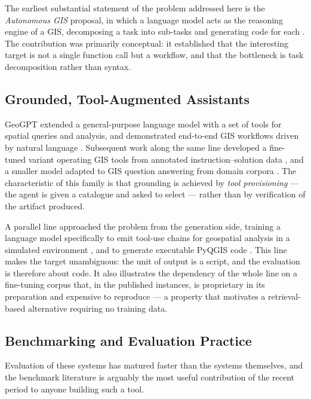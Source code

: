 The earliest substantial statement of the problem addressed here is the
\emph{Autonomous GIS} proposal, in which a language model acts as the reasoning
engine of a GIS, decomposing a task into sub-tasks and generating code for each
\cite{li2023autonomousgis}. The contribution was primarily conceptual: it
established that the interesting target is not a single function call but a
workflow, and that the bottleneck is task decomposition rather than syntax.

\subsection{Grounded, Tool-Augmented Assistants}

GeoGPT extended a general-purpose language model with a set of tools for
spatial queries and analysis, and demonstrated end-to-end GIS workflows driven
by natural language \cite{zhang2023geogpt}. Subsequent work along the same line
developed a fine-tuned variant operating GIS tools from annotated
instruction--solution data \cite{wei2024geotoolgpt}, and a smaller model adapted
to GIS question answering from domain corpora \cite{zhang2024bbgeogpt}. The
characteristic of this family is that grounding is achieved by \emph{tool
provisioning} --- the agent is given a catalogue and asked to select --- rather
than by verification of the artifact produced.

A parallel line approached the problem from the generation side, training a
language model specifically to emit tool-use chains for geospatial analysis in
a simulated environment \cite{zhang2024geollmtooluse}, and to generate
executable PyQGIS code \cite{mansourian2024chatgeoai}. This line makes the
target unambiguous: the unit of output is a script, and the
evaluation is therefore about code. It also illustrates the dependency of the
whole line on a fine-tuning corpus that, in the published instances, is
proprietary in its preparation and expensive to reproduce --- a property that
motivates a retrieval-based alternative requiring no training data.

\subsection{Benchmarking and Evaluation Practice}

Evaluation of these systems has matured faster than the systems themselves, and
the benchmark literature is arguably the most useful contribution of the recent
period to anyone building such a tool.

